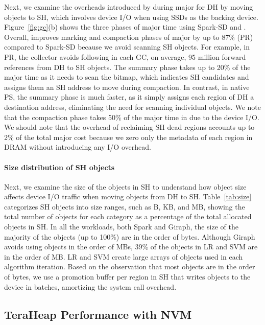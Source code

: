 Next, we examine the overheads introduced by \teraheapName{} during major \teraheapGC for DH by
moving objects to SH, which involves device I/O when using SSDs as the backing
device. Figure~\ref{fig:gc}(b) shows the three phases of major \teraheapGC time using
Spark-SD and \teraheapName{}. Overall, \teraheapName{} improves marking and compaction phases of
major \teraheapGC by up to 87\% (PR) compared to Spark-SD because we avoid scanning SH
objects. For example, in PR, the collector avoids following in each GC, on
average, 95 million forward references from DH to SH objects. The summary phase
takes up to 20\% of the major \teraheapGC time as it needs to scan the bitmap, which
indicates SH candidates and assigns them an SH address to move during
compaction. In contrast, in native PS, the summary phase is much faster, as it
simply assigns each region of DH a destination address, eliminating the need for
scanning individual objects. We note that the compaction phase takes 50\% of the
major \teraheapGC time in \teraheapName{} due to the device I/O. We should note that the
overhead of reclaiming SH dead regions accounts up to 2\% of the total major \teraheapGC
cost because we zero only the metadata of each region in DRAM without
introducing any I/O overhead.

\paragraph{\textbf{Size distribution of SH objects}}

Next, we examine the size of the objects in SH to understand how
object size affects device I/O traffic when moving objects from DH
to SH. Table~\ref{tab:size} categorizes SH objects into size ranges,
such as B, KB, and MB, showing the total number of objects for each
category as a percentage of the total allocated objects in SH. In all
the workloads, both Spark and Giraph, the size of the majority of the
objects (up to 100\%) are in the order of bytes. Although Giraph
avoids using objects in the order of MBs, 39\% of the objects in LR
and SVM are in the order of MB. LR and SVM create large arrays of
objects used in each algorithm iteration. Based on the observation
that most objects are in the order of bytes, we use a promotion buffer
per region in SH that writes objects to the device in batches,
amortizing the system call overhead.

\subsection{TeraHeap Performance with NVM}
\label{sec:nvm}

